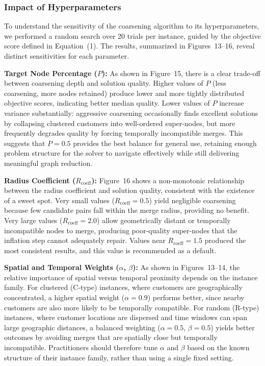 \documentclass[conference]{IEEEtran}
\begin{document}
\subsubsection{Impact of Hyperparameters}
To understand the sensitivity of the coarsening algorithm to its hyperparameters, we performed a random search over 20 trials per instance, guided by the objective score defined in Equation~(1). The results, summarized in Figures~13–16, reveal distinct sensitivities for each parameter.

\textbf{Target Node Percentage ($P$):} As shown in Figure~15, there is a clear trade-off between coarsening depth and solution quality. Higher values of $P$ (less coarsening, more nodes retained) produce lower and more tightly distributed objective scores, indicating better median quality. Lower values of $P$ increase variance substantially: aggressive coarsening occasionally finds excellent solutions by collapsing clustered customers into well-ordered super-nodes, but more frequently degrades quality by forcing temporally incompatible merges. This suggests that $P = 0.5$ provides the best balance for general use, retaining enough problem structure for the solver to navigate effectively while still delivering meaningful graph reduction.

\textbf{Radius Coefficient ($R_\text{coeff}$):} Figure~16 shows a non-monotonic relationship between the radius coefficient and solution quality, consistent with the existence of a sweet spot. Very small values ($R_\text{coeff} = 0.5$) yield negligible coarsening because few candidate pairs fall within the merge radius, providing no benefit. Very large values ($R_\text{coeff} = 2.0$) allow geometrically distant or temporally incompatible nodes to merge, producing poor-quality super-nodes that the inflation step cannot adequately repair. Values near $R_\text{coeff} = 1.5$ produced the most consistent results, and this value is recommended as a default.

\textbf{Spatial and Temporal Weights ($\alpha$, $\beta$):} As shown in Figures~13–14, the relative importance of spatial versus temporal proximity depends on the instance family. For clustered (C-type) instances, where customers are geographically concentrated, a higher spatial weight ($\alpha = 0.9$) performs better, since nearby customers are also more likely to be temporally compatible. For random (R-type) instances, where customer locations are dispersed and time windows can span large geographic distances, a balanced weighting ($\alpha = 0.5$, $\beta = 0.5$) yields better outcomes by avoiding merges that are spatially close but temporally incompatible. Practitioners should therefore tune $\alpha$ and $\beta$ based on the known structure of their instance family, rather than using a single fixed setting.
\end{document}
